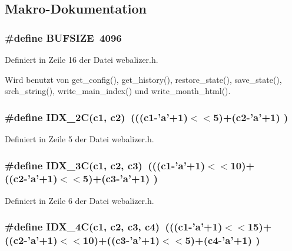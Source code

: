 \subsection{Makro-Dokumentation}
\subsubsection{\setlength{\rightskip}{0pt plus 5cm}\#define BUFSIZE~4096}\label{webalizer_8h_eca034f67218340ecb2261a22c2f3dcd}




Definiert in Zeile 16 der Datei webalizer.h.

Wird benutzt von get\_\-config(), get\_\-history(), restore\_\-state(), save\_\-state(), srch\_\-string(), write\_\-main\_\-index() und write\_\-month\_\-html().
\subsubsection{\setlength{\rightskip}{0pt plus 5cm}\#define IDX\_\-2C(c1, c2)~(((c1-'a'+1)$<$$<$5)+(c2-'a'+1) )}\label{webalizer_8h_4e6c8a23bbe623659548c4b567bb06df}




Definiert in Zeile 5 der Datei webalizer.h.
\subsubsection{\setlength{\rightskip}{0pt plus 5cm}\#define IDX\_\-3C(c1, c2, c3)~(((c1-'a'+1)$<$$<$10)+((c2-'a'+1)$<$$<$5)+(c3-'a'+1) )}\label{webalizer_8h_d70b6fe1fe6cb2c356bbc8268ad87774}




Definiert in Zeile 6 der Datei webalizer.h.
\subsubsection{\setlength{\rightskip}{0pt plus 5cm}\#define IDX\_\-4C(c1, c2, c3, c4)~(((c1-'a'+1)$<$$<$15)+((c2-'a'+1)$<$$<$10)+((c3-'a'+1)$<$$<$5)+(c4-'a'+1) )}\label{webalizer_8h_250c884e24a342d554caefc036bf27c1}




